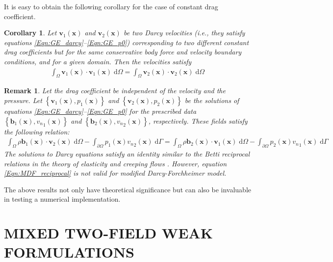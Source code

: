 \documentclass[11pt,reqno]{amsart}
\newtheorem{remark}[theorem]{Remark}
\newtheorem{corollary}[theorem]{Corollary}
\begin{document}
It is easy to obtain the following corollary for 
the case of constant drag coefficient.
\begin{corollary}
  Let $\mathbf{v}_1(\mathbf{x})$ and $\mathbf{v}_2(\mathbf{x})$ 
  be two Darcy velocities (i.e., they satisfy equations 
  \eqref{Eqn:GE_darcy}--\eqref{Eqn:GE_p0}) corresponding 
  to two different \emph{constant} drag coefficients but 
  for the same conservative body force and velocity 
  boundary conditions, and for a given domain. Then 
  the velocities satisfy 
  \begin{align}
    \int_{\Omega} \mathbf{v}_1(\mathbf{x}) \cdot 
    \mathbf{v}_1(\mathbf{x}) \; \mathrm{d} \Omega = 
    \int_{\Omega} \mathbf{v}_2(\mathbf{x}) \cdot 
    \mathbf{v}_2(\mathbf{x}) \; \mathrm{d} \Omega
  \end{align}
\end{corollary}
\begin{remark}
  Let the drag coefficient be independent of 
  the velocity and the pressure. Let $\left\{
  \mathbf{v}_1(\mathbf{x}), p_1(\mathbf{x})
  \right\}$ and $\left\{\mathbf{v}_2(\mathbf{x}), p_2
  (\mathbf{x})\right\}$ be the solutions of equations 
  \eqref{Eqn:GE_darcy}--\eqref{Eqn:GE_p0} for the 
  prescribed data $\left\{\mathbf{b}_1(\mathbf{x}), 
  {v_n}_1(\mathbf{x})\right\}$ and $\left\{\mathbf{b}_2
  (\mathbf{x}), {v_n}_2(\mathbf{x})\right\}$, respectively. 
  These fields satisfy the following relation:
\begin{align}
    \label{Eqn:MDF_reciprocal}
    \int_{\Omega} \rho \mathbf{b}_1(\mathbf{x}) \cdot 
    \mathbf{v}_2(\mathbf{x}) \; \mathrm{d} \Omega
- \int_{\partial \Omega} p_1(\mathbf{x}) {v_n}_2(\mathbf{x}) 
    \; \mathrm{d} \Gamma
= \int_{\Omega} \rho \mathbf{b}_2(\mathbf{x}) \cdot 
    \mathbf{v}_1(\mathbf{x}) \; \mathrm{d} \Omega
- \int_{\partial \Omega} p_2(\mathbf{x}) {v_n}_1(\mathbf{x}) 
    \; \mathrm{d} \Gamma
  \end{align}
The solutions to Darcy equations satisfy an identity 
  similar to the Betti reciprocal relations in the 
  theory of elasticity \cite{Sadd,Truesdell_Noll} 
  and creeping flows \cite{Guazzelli_Morris}.
However, equation \eqref{Eqn:MDF_reciprocal} is 
  not valid for modified Darcy-Forchheimer model. 
\end{remark}
The above results not only have theoretical significance 
but can also be invaluable in testing a numerical 
implementation.
 
\section{MIXED TWO-FIELD WEAK FORMULATIONS}
\label{Ch:Mixed}
\end{document}

